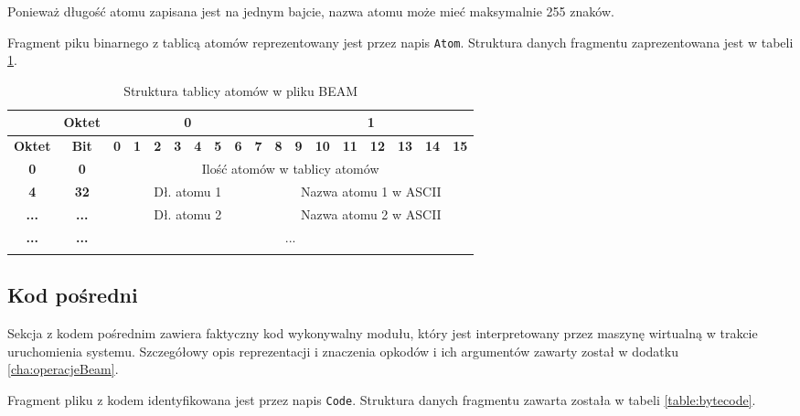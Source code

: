 Ponieważ długość atomu zapisana jest na jednym bajcie, nazwa atomu może mieć maksymalnie 255 znaków.

Fragment piku binarnego z tablicą atomów reprezentowany jest przez napis \texttt{Atom}. Struktura danych fragmentu zaprezentowana jest w tabeli \ref{table:atomTable}.

\begin{longtable}{|c|c|c|c|c|c|c|c|c|c|c|c|c|c|c|c|c|c|}
\hline
         & \textbf{Oktet} & \multicolumn{8}{|c|}{\textbf{0}} & \multicolumn{8}{|c|}{\textbf{1}} \\
\hline
\textbf{Oktet} & \textbf{Bit} & \textbf{0} & \textbf{1} & \textbf{2} & \textbf{3} & \textbf{4} & \textbf{5} & \textbf{6} & \textbf{7} & \textbf{8} & \textbf{9} & \textbf{10} & \textbf{11} & \textbf{12} & \textbf{13} & \textbf{14} & \textbf{15}\\
\hline
\textbf{0} & \textbf{0} & \multicolumn{16}{|c|}{Ilość atomów w tablicy atomów} \\[3ex]
\hline
\textbf{4} & \textbf{32} & \multicolumn{8}{|c|}{Dł. atomu 1} & \multicolumn{8}{|c|}{Nazwa atomu 1 w ASCII}\\[3ex]
\hline
\textbf{...} & \textbf{...} & \multicolumn{8}{|c|}{Dł. atomu 2} & \multicolumn{8}{|c|}{Nazwa atomu 2 w ASCII}\\[3ex]
\hline
\textbf{...} & \textbf{...} & \multicolumn{16}{|c|}{...} \\[3ex]
\hline
\caption{Struktura tablicy atomów w pliku BEAM}
\label{table:atomTable} \\
\end{longtable}

\subsection{Kod pośredni}
Sekcja z kodem pośrednim zawiera faktyczny kod wykonywalny modułu, który jest interpretowany przez maszynę wirtualną w trakcie uruchomienia systemu.
Szczegółowy opis reprezentacji i znaczenia opkodów i ich argumentów zawarty został w dodatku \ref{cha:operacjeBeam}.

Fragment pliku z kodem identyfikowana jest przez napis \texttt{Code}. Struktura danych fragmentu zawarta została w tabeli \ref{table:bytecode}. 

